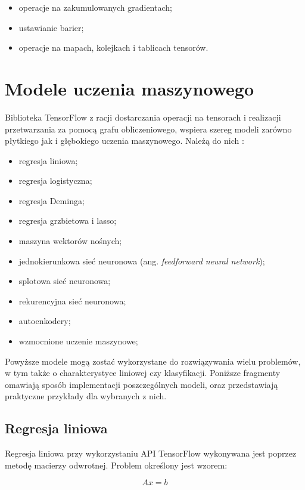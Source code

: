 \begin{itemize}
	\item operacje na zakumulowanych gradientach;
	\item ustawianie barier;
	\item operacje na mapach, kolejkach i tablicach tensorów.
	
\end{itemize}

\section{Modele uczenia maszynowego}

Biblioteka TensorFlow z racji dostarczania operacji na tensorach i realizacji przetwarzania za pomocą grafu obliczeniowego, wspiera szereg modeli zarówno płytkiego jak i głębokiego uczenia maszynowego. Należą do nich \cite{tfcookbook}:

\begin{itemize}
	\item regresja liniowa;
	\item regresja logistyczna;
	\item regresja Deminga;
	\item regresja grzbietowa i lasso;
	\item maszyna wektorów nośnych;
	\item jednokierunkowa sieć neuronowa (ang. \textit{feedforward neural network});
	\item splotowa sieć neuronowa;
	\item rekurencyjna sieć neuronowa;
	\item autoenkodery;
	\item wzmocnione uczenie maszynowe;
\end{itemize}

Powyższe modele mogą zostać wykorzystane do rozwiązywania wielu problemów, w tym także o charakterystyce liniowej czy klasyfikacji. Poniższe fragmenty omawiają sposób implementacji poszczególnych modeli, oraz przedstawiają praktyczne przykłady dla wybranych z nich.

\subsection{Regresja liniowa}

Regresja liniowa przy wykorzystaniu API TensorFlow wykonywana jest poprzez metodę macierzy odwrotnej. Problem określony jest wzorem:

\begin{equation}
	Ax = b
\end{equation}

